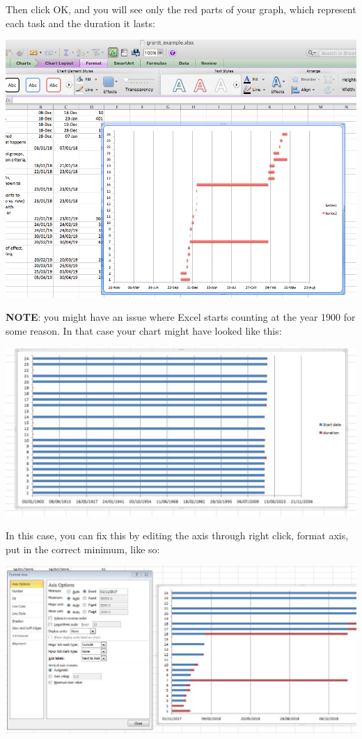 \documentclass[
]{book}
\begin{document}
Then click OK, and you will see only the red parts of your graph, which represent each task and the duration it lasts:

\includegraphics{imgs/gantt_blue_cleared.png}

\textbf{NOTE}: you might have an issue where Excel starts counting at the year 1900 for some reason. In that case your chart might have looked like this:

\includegraphics{imgs/1900_chart_default.jpg}

In this case, you can fix this by editing the axis through right click, format axis, put in the correct minimum, like so:

\includegraphics{imgs/Fixing_Gantt.jpg}
\end{document}
